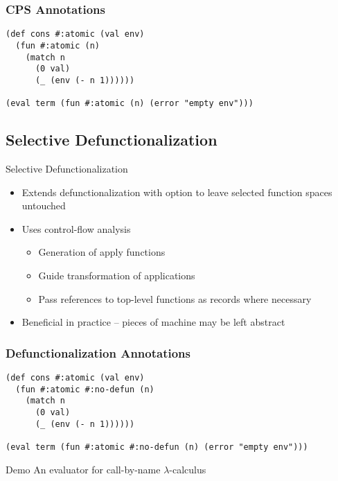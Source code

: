 \documentclass{beamer}
\newcommand{\LC}{\(\lambda\)-calculus}
\begin{document}
\begin{frame}[fragile]
  \frametitle{CPS Annotations}
  \begin{lstlisting}
(def cons #:atomic (val env)
  (fun #:atomic (n)
    (match n
      (0 val)
      (_ (env (- n 1))))))

(eval term (fun #:atomic (n) (error "empty env")))
  \end{lstlisting}
\end{frame}


\subsection{Selective Defunctionalization}

\begin{frame}{Selective Defunctionalization}
  \begin{itemize}
    \item Extends defunctionalization with option to leave selected function spaces untouched
    \item Uses control-flow analysis
    \begin{itemize}
      \item Generation of apply functions
      \item Guide transformation of applications
      \item Pass references to top-level functions as records where necessary
    \end{itemize}
    \item Beneficial in practice -- pieces of machine may be left abstract
  \end{itemize}
\end{frame}

\begin{frame}[fragile]
  \frametitle{Defunctionalization Annotations}
  \begin{lstlisting}
(def cons #:atomic (val env)
  (fun #:atomic #:no-defun (n)
    (match n
      (0 val)
      (_ (env (- n 1))))))

(eval term (fun #:atomic #:no-defun (n) (error "empty env")))
  \end{lstlisting}
\end{frame}

\begin{frame}{Demo}
  \centering
  An evaluator for call-by-name \LC{}
\end{frame}
\end{document}
